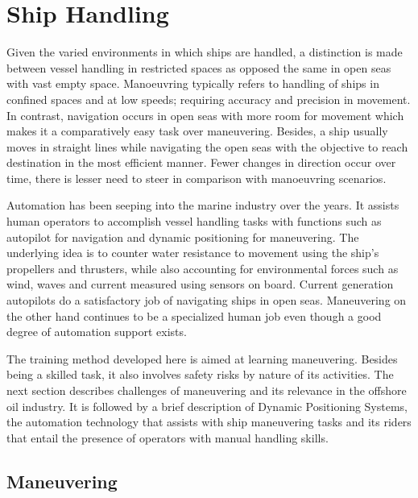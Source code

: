 \section{Ship Handling}

Given the varied environments in which ships are handled, a distinction is made between vessel handling in restricted spaces as opposed the same in open seas with vast empty space. Manoeuvring typically refers to handling of ships in confined spaces and at low speeds; requiring accuracy and precision in movement. In contrast, navigation occurs in open seas with more room for movement which makes it a comparatively easy task over maneuvering. Besides, a ship usually moves in straight lines while navigating the open seas with the objective to reach destination in the most efficient manner. Fewer changes in direction occur over time, there is lesser need to steer in comparison with manoeuvring scenarios. 

Automation has been seeping into the marine industry over the years. It assists human operators to accomplish vessel handling tasks with functions such as autopilot for navigation and dynamic positioning for maneuvering. The underlying idea is to counter water resistance to movement using the ship's propellers and thrusters, while also accounting for environmental forces such as wind, waves and current measured using sensors on board. Current generation autopilots do a satisfactory job of navigating ships in open seas. Maneuvering on the other hand continues to be a specialized human job even though a good degree of automation support exists.


The training method developed here is aimed at learning maneuvering. Besides being a skilled task, it also involves safety risks by nature of its activities. The next section describes challenges of maneuvering and its relevance in the offshore oil industry. It is followed by a brief description of Dynamic Positioning Systems, the automation technology that assists with ship maneuvering tasks and its riders that entail the presence of operators with manual handling skills. 

\subsection{Maneuvering}

